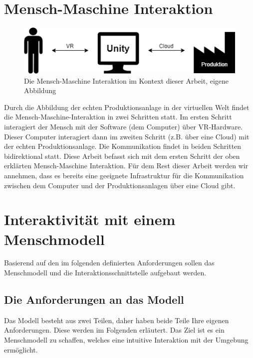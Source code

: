 \section{Mensch-Maschine Interaktion}\label{sec:MMInteraktion}
\begin{figure}[h]
	\centering
	\includegraphics[width=0.7\linewidth]{Bilder/A19_MMI}
	\caption{Die Mensch-Maschine Interaktion im Kontext dieser Arbeit, eigene Abbildung}
	\label{fig:MMI}
\end{figure}
\noindent Durch die Abbildung der echten Produktionsanlage in der virtuellen Welt findet die Mensch-Maschine-Interaktion in zwei Schritten statt. Im ersten Schritt interagiert der Mensch mit der Software (dem Computer) über VR-Hardware. Dieser Computer interagiert dann im zweiten Schritt (z.B. über eine Cloud) mit der echten Produktionsanlage. Die Kommunikation findet in beiden Schritten bidirektional statt.
\newline
Diese Arbeit befasst sich mit dem ersten Schritt der oben erklärten Mensch-Maschine Interaktion. Für dem Rest dieser Arbeit werden wir annehmen, dass es bereits eine geeignete Infrastruktur für die Kommunikation zwischen dem Computer und der Produktionsanlagen über eine Cloud gibt.

\section{Interaktivität mit einem Menschmodell}\label{sec:ModellAufbau}
Basierend auf den im folgenden definierten Anforderungen sollen das Menschmodell und die Interaktionsschnittstelle aufgebaut werden.

\subsection{Die Anforderungen an das Modell}\label{sec:AnforderungenKonzept}
Das Modell besteht aus zwei Teilen, daher haben beide Teile Ihre eigenen Anforderungen. Diese werden im Folgenden erläutert. Das Ziel ist es ein Menschmodell zu schaffen, welches eine intuitive Interaktion mit der Umgebung ermöglicht.

